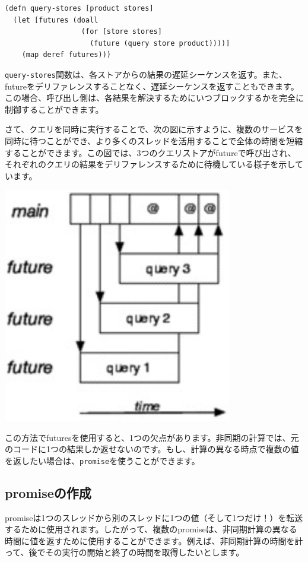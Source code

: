 \begin{lstlisting}[numbers=none]
(defn query-stores [product stores]
  (let [futures (doall
                  (for [store stores]
                    (future (query store product))))]
    (map deref futures)))
\end{lstlisting}

\texttt{query-stores}関数は、各ストアからの結果の遅延シーケンスを返す。また、futureをデリファレンスすることなく、遅延シーケンスを返すこともできます。この場合、呼び出し側は、各結果を解決するためにいつブロックするかを完全に制御することができます。

さて、クエリを同時に実行することで、次の図に示すように、複数のサービスを同時に待つことができ、より多くのスレッドを活用することで全体の時間を短縮することができます。この図では、3つのクエリストアがfutureで呼び出され、それぞれのクエリの結果をデリファレンスするために待機している様子を示しています。

\includegraphics[width=10cm]{fig_05_004.eps}

この方法でfuturesを使用すると、1つの欠点があります。非同期の計算では、元のコードに1つの結果しか返せないのです。もし、計算の異なる時点で複数の値を返したい場合は、\texttt{promise}を使うことができます。

\subsection{promiseの作成}

promiseは1つのスレッドから別のスレッドに1つの値（そして1つだけ！）を転送するために使用されます。したがって、複数のpromiseは、非同期計算の異なる時間に値を返すために使用することができます。例えば、非同期計算の時間を計って、後でその実行の開始と終了の時間を取得したいとします。


